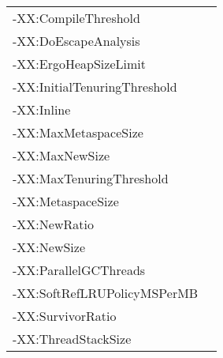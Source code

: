 \documentclass[
  digital, %
  oneside,
  notable, %
  nolof,     %
  nolot     %
]{fithesis3}
\begin{document}
\begin{table}[]
\begin{tabular}{ll}
	\multicolumn{1}{|l|}{-XX:CompileThreshold}                       &                                                             \\ \cline{1-1}
	\multicolumn{1}{|l|}{-XX:DoEscapeAnalysis}                       &                                                             \\ \cline{1-1}
	\multicolumn{1}{|l|}{-XX:ErgoHeapSizeLimit}                      &                                                             \\ \cline{1-1}
	\multicolumn{1}{|l|}{-XX:InitialTenuringThreshold}               &                                                             \\ \cline{1-1}
	\multicolumn{1}{|l|}{-XX:Inline}                                 &                                                             \\ \cline{1-1}
	\multicolumn{1}{|l|}{-XX:MaxMetaspaceSize}                       &                                                             \\ \cline{1-1}
	\multicolumn{1}{|l|}{-XX:MaxNewSize}                             &                                                             \\ \cline{1-1}
	\multicolumn{1}{|l|}{-XX:MaxTenuringThreshold}                   &                                                             \\ \cline{1-1}
	\multicolumn{1}{|l|}{-XX:MetaspaceSize}                          &                                                             \\ \cline{1-1}
	\multicolumn{1}{|l|}{-XX:NewRatio}                               &                                                             \\ \cline{1-1}
	\multicolumn{1}{|l|}{-XX:NewSize}                                &                                                             \\ \cline{1-1}
	\multicolumn{1}{|l|}{-XX:ParallelGCThreads}                      &                                                             \\ \cline{1-1}
	\multicolumn{1}{|l|}{-XX:SoftRefLRUPolicyMSPerMB}                &                                                             \\ \cline{1-1}
	\multicolumn{1}{|l|}{-XX:SurvivorRatio}                          &                                                             \\ \cline{1-1}
	\multicolumn{1}{|l|}{-XX:ThreadStackSize}                        &                                                             \\ \cline{1-1}

\end{tabular}
\end{table}
\end{document}
